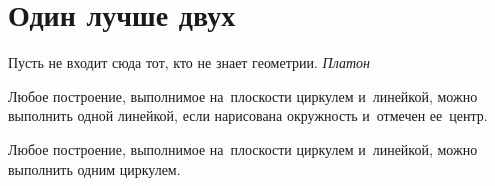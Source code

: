 

\section*{Один лучше двух}


\begin{flushright}\footnotesize
Пусть не входит сюда тот, кто не знает геометрии.
\emph{Платон}
\end{flushright}

Любое построение, выполнимое на~плоскости циркулем и~линейкой, можно выполнить
одной линейкой, если нарисована окружность и~отмечен ее~центр.

Любое построение, выполнимое на~плоскости циркулем и~линейкой, можно выполнить
одним циркулем.

